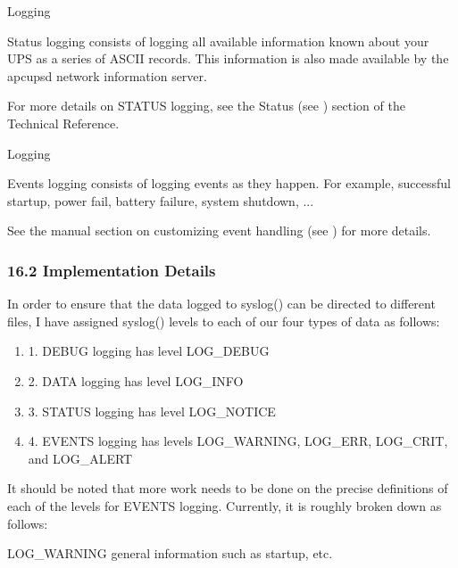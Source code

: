 {\smallSTATUS Logging}

Status logging consists of logging all available information known about your
UPS as a series of ASCII records. This information is also made available by
the apcupsd network information server.  

For more details on STATUS logging, see the Status (see 
) section of
the Technical Reference. 

{\smallEVENTS Logging}

Events logging consists of logging events as they happen. For example,
successful startup, power fail, battery failure, system shutdown, ...  

See the manual section on customizing event handling (see 
) for
more details. 

\label{Implementation-Details}

\subsubsection*{16.2 Implementation Details}

In order to ensure that the data logged to syslog() can be directed to
different files, I have assigned syslog() levels to each of our four types of
data as follows:  

\begin{enumerate}
\item 1. DEBUG logging has level LOG\_DEBUG  
\item 2. DATA logging has level LOG\_INFO  
\item 3. STATUS logging has level LOG\_NOTICE  
\item 4. EVENTS logging has levels LOG\_WARNING, LOG\_ERR, LOG\_CRIT, and
LOG\_ALERT  
\end{enumerate}

It should be noted that more work needs to be done on the precise definitions
of each of the levels for EVENTS logging. Currently, it is roughly broken down
as follows:  

LOG\_WARNING general information such as startup, etc.  

